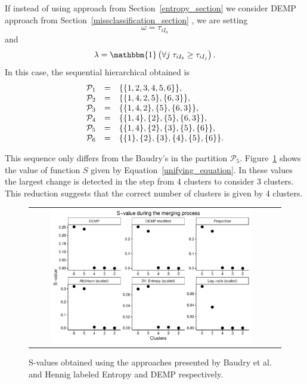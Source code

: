 \documentclass[10pt, a4paper]{article}
\theoremstyle{definition}
\begin{document}
\begin{spacing}{1.9}
If instead of using approach from Section~\ref{entropy_section} \citep{baudry2010combining} we consider DEMP approach from Section~\ref{missclassification_section} \citep{hennig2010methods}, we are setting \[\omega = \tau_{i I_a}\] and \[\lambda = \mathbbm{1}\left( \forall j\; \tau_{i I_{b}} \geq \tau_{iI_j} \right).\] In this case, the sequential hierarchical obtained is
\begin{equation}
\begin{array}{r c l}
\mathcal{P}_1 &=& \{\{1, 2, 3, 4, 5, 6\}\}, \\
\mathcal{P}_2 &=& \{\{1, 4, 2, 5\}, \{6, 3\} \},  \\
\mathcal{P}_3 &=& \{\{1, 4, 2\}, \{5\}, \{6, 3\} \}, \\
\mathcal{P}_4 &=& \{\{1, 4\},\{2\}, \{5\}, \{6, 3\} \}, \\
\mathcal{P}_5 &=& \{\{1, 4\},\{2\}, \{3\},\{5\},\{6\} \},\\
\mathcal{P}_6 &=& \{\{1\},\{2\},\{3\},\{4\},\{5\},\{6\}\}.
\end{array}
\end{equation}



This sequence only differs from the Baudry's in the partition $\mathcal{P}_5$.  Figure~\ref{gaussian_Svalues} shows the value of function $S$ given by Equation~\ref{unifying_equation}. In these values the largest change is detected in the step from 4 clusters to consider 3 clusters. This reduction suggests that the correct number of clusters is given by 4 clusters.
\begin{figure}[t]
\begin{center}
\begin{tabular}{cc}
  \includegraphics[width=0.85\textwidth]{figures/gaussian_Svalues.pdf} \\
 \end{tabular}
 \caption{S-values obtained using the approaches presented by Baudry et al. and Hennig labeled Entropy and DEMP respectively.}\label{gaussian_Svalues}
\end{center}
\end{figure}


\end{spacing}
\end{document}
